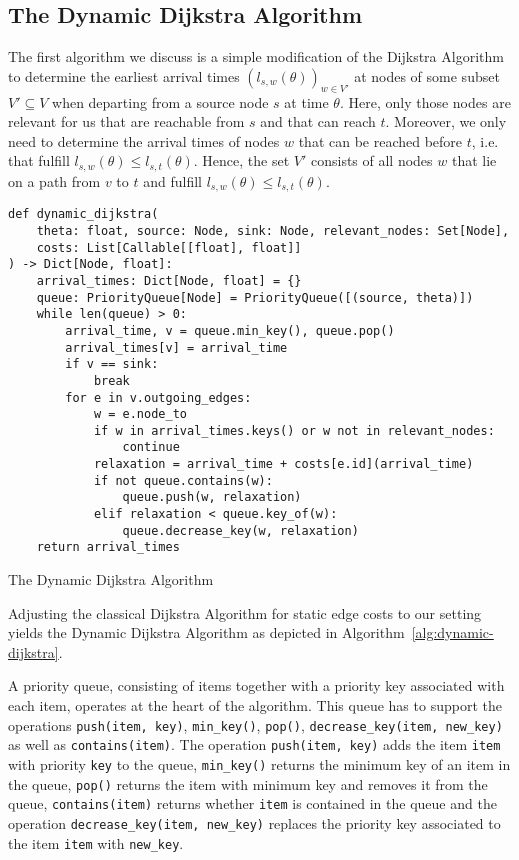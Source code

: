 \subsection{The Dynamic Dijkstra Algorithm}

The first algorithm we discuss is a simple modification of the Dijkstra Algorithm to determine the earliest arrival times $(l_{s,w}(\theta))_{w\in V'}$ at nodes of some subset $V'\subseteq V$ when departing from a source node $s$ at time $\theta$.
Here, only those nodes are relevant for us that are reachable from $s$ and that can reach $t$.
Moreover, we only need to determine the arrival times of nodes $w$ that can be reached before $t$, i.e. that fulfill $l_{s,w}(\theta) \leq l_{s,t}(\theta)$.
Hence, the set $V'$ consists of all nodes $w$ that lie on a path from $v$ to $t$ and fulfill $l_{s,w}(\theta) \leq l_{s,t}(\theta)$.

\begin{algorithm}[h]
\begin{verbatim}
def dynamic_dijkstra(
    theta: float, source: Node, sink: Node, relevant_nodes: Set[Node],
    costs: List[Callable[[float], float]]
) -> Dict[Node, float]:
    arrival_times: Dict[Node, float] = {}
    queue: PriorityQueue[Node] = PriorityQueue([(source, theta)])
    while len(queue) > 0:
        arrival_time, v = queue.min_key(), queue.pop()
        arrival_times[v] = arrival_time
        if v == sink:
            break
        for e in v.outgoing_edges:
            w = e.node_to
            if w in arrival_times.keys() or w not in relevant_nodes:
                continue
            relaxation = arrival_time + costs[e.id](arrival_time)
            if not queue.contains(w):
                queue.push(w, relaxation)
            elif relaxation < queue.key_of(w):
                queue.decrease_key(w, relaxation)
    return arrival_times
\end{verbatim}
\caption{The Dynamic Dijkstra Algorithm}
\label{alg:dynamic-dijkstra}
\end{algorithm}

Adjusting the classical Dijkstra Algorithm for static edge costs to our setting yields the Dynamic Dijkstra Algorithm as depicted in Algorithm~\ref{alg:dynamic-dijkstra}.

A priority queue, consisting of items together with a priority key associated with each item, operates at the heart of the algorithm.
This queue has to support the operations \texttt{push(item, key)}, \texttt{min\_key()}, \texttt{pop()}, \texttt{decrease\_key(item, new\_key)} as well as \texttt{contains(item)}.
The operation \texttt{push(item, key)} adds the item \texttt{item} with priority \texttt{key} to the queue, \texttt{min\_key()} returns the minimum key of an item in the queue, \texttt{pop()} returns the item with minimum key and removes it from the queue, \texttt{contains(item)} returns whether \texttt{item} is contained in the queue and the operation \texttt{decrease\_key(item, new\_key)} replaces the priority key associated to the item \texttt{item} with \texttt{new\_key}.


